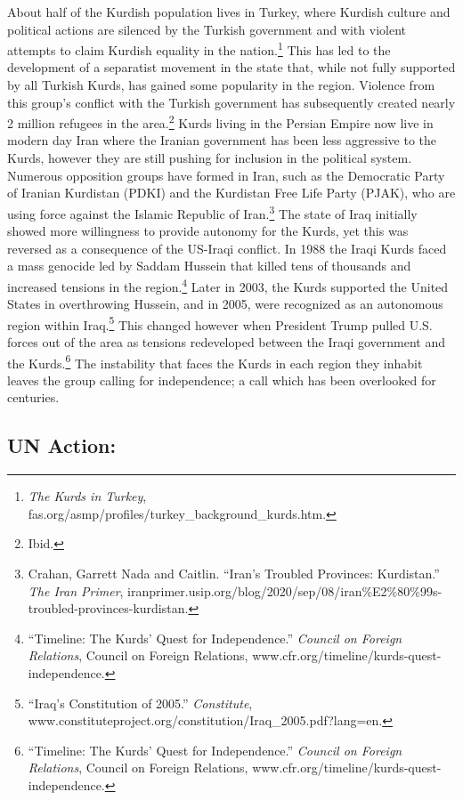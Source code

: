 \documentclass[10pt, letterpaper]{article}
\begin{document}
About half of the Kurdish population lives in Turkey, where Kurdish
culture and political actions are silenced by the Turkish government and
with violent attempts to claim Kurdish equality in the
nation.\footnote{\emph{The Kurds in Turkey},
  fas.org/asmp/profiles/turkey\_background\_kurds.htm.} This has led to
the development of a separatist movement in the state that, while not
fully supported by all Turkish Kurds, has gained some popularity in the
region. Violence from this group's conflict with the Turkish government
has subsequently created nearly 2 million refugees in the
area.\footnote{Ibid.} Kurds living in the Persian Empire now live in
modern day Iran where the Iranian government has been less aggressive to
the Kurds, however they are still pushing for inclusion in the political
system. Numerous opposition groups have formed in Iran, such as the
Democratic Party of Iranian Kurdistan (PDKI) and the Kurdistan Free Life
Party (PJAK), who are using force against the Islamic Republic of
Iran.\footnote{Crahan, Garrett Nada and Caitlin. ``Iran's Troubled
  Provinces: Kurdistan.'' \emph{The Iran Primer},
  iranprimer.usip.org/blog/2020/sep/08/iran\%E2\%80\%99s-troubled-provinces-kurdistan.}
The state of Iraq initially showed more willingness to provide autonomy
for the Kurds, yet this was reversed as a consequence of the US-Iraqi
conflict. In 1988 the Iraqi Kurds faced a mass genocide led by Saddam
Hussein that killed tens of thousands and increased tensions in the
region.\footnote{``Timeline: The Kurds' Quest for Independence.''
  \emph{Council on Foreign Relations}, Council on Foreign Relations,
  www.cfr.org/timeline/kurds-quest-independence.} Later in 2003, the
Kurds supported the United States in overthrowing Hussein, and in 2005,
were recognized as an autonomous region within Iraq.\footnote{``Iraq's
  Constitution of 2005.'' \emph{Constitute},
  www.constituteproject.org/constitution/Iraq\_2005.pdf?lang=en.} This
changed however when President Trump pulled U.S. forces out of the area
as tensions redeveloped between the Iraqi government and the
Kurds.\footnote{``Timeline: The Kurds' Quest for Independence.''
  \emph{Council on Foreign Relations}, Council on Foreign Relations,
  www.cfr.org/timeline/kurds-quest-independence.} The instability that
faces the Kurds in each region they inhabit leaves the group calling for
independence; a call which has been overlooked for centuries. \\

\subsection{UN Action:}
\end{document}

